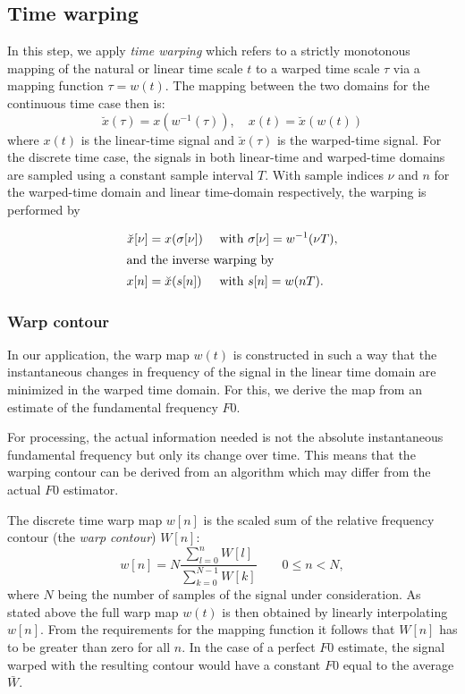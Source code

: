 \subsection{Time warping}
\label{sub:Refinement}

In this step, we apply \emph{time warping} which refers to a strictly monotonous mapping
of the natural or linear time scale $t$ to a warped time scale $\tau$ via a
mapping function $\tau=w(t)$.
The mapping between the two domains for the continuous time case then is:
\begin{equation}\label{eq:contWarpedTime}
\breve{x}(\tau)=x(w^{-1}(\tau)), \quad x(t)=\breve{x}(w(t))
\end{equation}
where $x(t)$ is the linear-time signal and $\breve{x}(\tau)$ is the warped-time signal.
For the discrete time case, the signals in both linear-time and warped-time domains are sampled
using a constant sample interval $T$. With sample indices $\nu$ and $n$ for the warped-time domain and linear time-domain respectively, the warping is performed by

\begin{align}
\breve{x}[\nu] &= x(\sigma[\nu]) & \textrm{ with } & \sigma[\nu] = w^{-1}(\nu T), \\
\intertext{and the inverse warping by}
x{}[n] &= \breve{x}(s[n]) & \textrm{ with } & s{}[n] = w(nT).
\end{align}

\subsubsection{Warp contour}
\label{subs:warp_contour}

In our application, the warp map $w(t)$ is constructed in such a way that the instantaneous changes in frequency of the signal in the linear time domain are minimized in the warped time domain. For this, we derive the map from an estimate of the fundamental frequency $F0$.

For processing, the actual information needed is not the absolute instantaneous fundamental frequency but only its change over time. This means that the warping contour can be derived from an algorithm which may differ from the actual $F0$ estimator.

The discrete time warp map $w[n]$ is the scaled sum of the relative
frequency contour (the \emph{warp contour}) $W[n]$:
\begin{equation}
w[n]=N \frac{\sum^n_{l=0}{W[l]}}{\sum^{N-1}_{k=0}{W[k]}}  \qquad 0\leq n<N,
\end{equation}
where $N$ being the number of samples of the signal under consideration.
As stated above the full warp map $w(t)$ is then obtained by linearly interpolating $w[n]$. From the requirements for the mapping function it follows that $W[n]$ has to be greater than zero for all $n$. In the case of a perfect $F0$ estimate, the signal warped with the resulting contour would have a constant $F0$ equal to the average $\bar{W}$.

